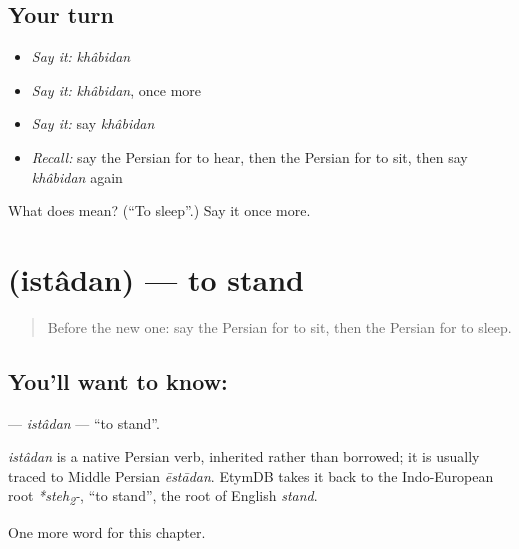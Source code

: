\subsection*{Your turn}
\begin{itemize}
\raggedright
  \item \emph{Say it:} \emph{khâbidan}
  \item \emph{Say it:} \emph{khâbidan}, once more
  \item \emph{Say it:} say \emph{khâbidan}
  \item \emph{Recall:} say the Persian for to hear, then the Persian for to sit, then say \emph{khâbidan} again
\end{itemize}

\begin{tcolorbox}[breakable,colback=teal!4,colframe=teal!35!black,title={Before you move on}]
What does  mean? (\textquotedblleft{}To sleep\textquotedblright{}.) Say it once more.
\end{tcolorbox}
\section[\texorpdfstring{\fa{ایستادن} (istâdan)}{ایستادن (istâdan)}]{ (istâdan) — to stand}

\label{lesson:FA-C36-istadan}



\begin{quote}
Before the new one: say the Persian for to sit, then the Persian for to sleep.
\end{quote}

\subsection*{You'll want to know: }
\textbf{} — \emph{istâdan} — \textquotedblleft{}to stand\textquotedblright{}.

\begin{cousinweb}
\emph{istâdan} is a native Persian verb, inherited rather than borrowed; it is usually traced to Middle Persian \emph{ēstādan}. EtymDB takes it back to the Indo-European root \emph{*steh\textsubscript{2}-}, \textquotedblleft{}to stand\textquotedblright{}, the root of English \emph{stand}.
\end{cousinweb}

\begin{grammarlens}[title={What you've built}]
One more word for this chapter.
\end{grammarlens}

